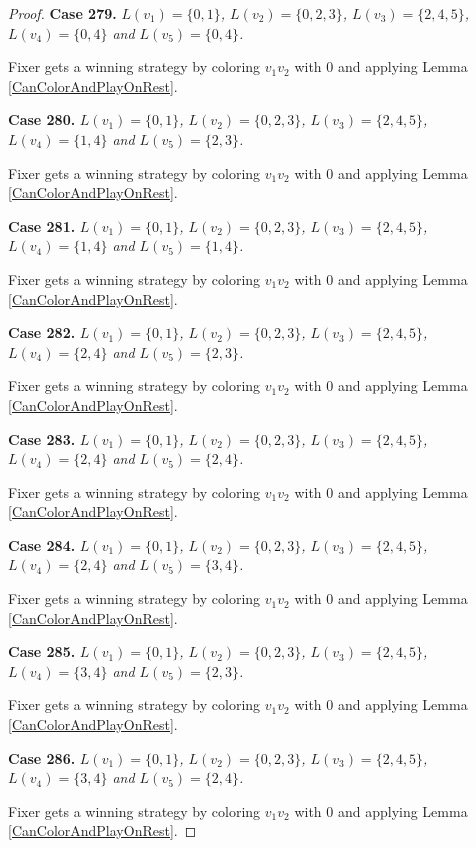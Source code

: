 \documentclass[12pt]{amsart}
\theoremstyle{plain}
\theoremstyle{definition}
\theoremstyle{remark}
\begin{document}
\begin{proof}
\noindent\textbf{Case 279.  }\textit{$L(v_1) = \{0, 1\}$, $L(v_2) = \{0, 2, 3\}$, $L(v_3) = \{2, 4, 5\}$, $L(v_4) = \{0, 4\}$ and $L(v_5) = \{0, 4\}$.}

Fixer gets a winning strategy by coloring $v_1v_2$ with $0$ and applying Lemma \ref{CanColorAndPlayOnRest}.

\noindent\textbf{Case 280.  }\textit{$L(v_1) = \{0, 1\}$, $L(v_2) = \{0, 2, 3\}$, $L(v_3) = \{2, 4, 5\}$, $L(v_4) = \{1, 4\}$ and $L(v_5) = \{2, 3\}$.}

Fixer gets a winning strategy by coloring $v_1v_2$ with $0$ and applying Lemma \ref{CanColorAndPlayOnRest}.

\noindent\textbf{Case 281.  }\textit{$L(v_1) = \{0, 1\}$, $L(v_2) = \{0, 2, 3\}$, $L(v_3) = \{2, 4, 5\}$, $L(v_4) = \{1, 4\}$ and $L(v_5) = \{1, 4\}$.}

Fixer gets a winning strategy by coloring $v_1v_2$ with $0$ and applying Lemma \ref{CanColorAndPlayOnRest}.

\noindent\textbf{Case 282.  }\textit{$L(v_1) = \{0, 1\}$, $L(v_2) = \{0, 2, 3\}$, $L(v_3) = \{2, 4, 5\}$, $L(v_4) = \{2, 4\}$ and $L(v_5) = \{2, 3\}$.}

Fixer gets a winning strategy by coloring $v_1v_2$ with $0$ and applying Lemma \ref{CanColorAndPlayOnRest}.

\noindent\textbf{Case 283.  }\textit{$L(v_1) = \{0, 1\}$, $L(v_2) = \{0, 2, 3\}$, $L(v_3) = \{2, 4, 5\}$, $L(v_4) = \{2, 4\}$ and $L(v_5) = \{2, 4\}$.}

Fixer gets a winning strategy by coloring $v_1v_2$ with $0$ and applying Lemma \ref{CanColorAndPlayOnRest}.

\noindent\textbf{Case 284.  }\textit{$L(v_1) = \{0, 1\}$, $L(v_2) = \{0, 2, 3\}$, $L(v_3) = \{2, 4, 5\}$, $L(v_4) = \{2, 4\}$ and $L(v_5) = \{3, 4\}$.}

Fixer gets a winning strategy by coloring $v_1v_2$ with $0$ and applying Lemma \ref{CanColorAndPlayOnRest}.

\noindent\textbf{Case 285.  }\textit{$L(v_1) = \{0, 1\}$, $L(v_2) = \{0, 2, 3\}$, $L(v_3) = \{2, 4, 5\}$, $L(v_4) = \{3, 4\}$ and $L(v_5) = \{2, 3\}$.}

Fixer gets a winning strategy by coloring $v_1v_2$ with $0$ and applying Lemma \ref{CanColorAndPlayOnRest}.

\noindent\textbf{Case 286.  }\textit{$L(v_1) = \{0, 1\}$, $L(v_2) = \{0, 2, 3\}$, $L(v_3) = \{2, 4, 5\}$, $L(v_4) = \{3, 4\}$ and $L(v_5) = \{2, 4\}$.}

Fixer gets a winning strategy by coloring $v_1v_2$ with $0$ and applying Lemma \ref{CanColorAndPlayOnRest}.


\end{proof}
\end{document}
